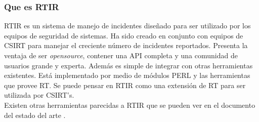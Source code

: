 \subsubsection{Que es RTIR}
RTIR es un sistema de manejo de incidentes diseñado para ser utilizado por los 
equipos de seguridad de sistemas. Ha sido creado en conjunto con equipos de CSIRT para manejar el creciente número de incidentes reportados.
Presenta la ventaja de ser \textit{opensource}, contener una API completa y una comunidad 
de usuarios grande y experta. Además es simple de integrar con otras 
herramientas existentes. Está implementado por medio de módulos PERL y las 
herramientas que provee RT. Se puede pensar en RTIR como una extensión de RT 
para ser utilizada por CSIRT's.\\

Existen otras herramientas parecidas a RTIR que se pueden ver en el documento del estado del arte \cite{AdvancedThreatsCollaboration}.